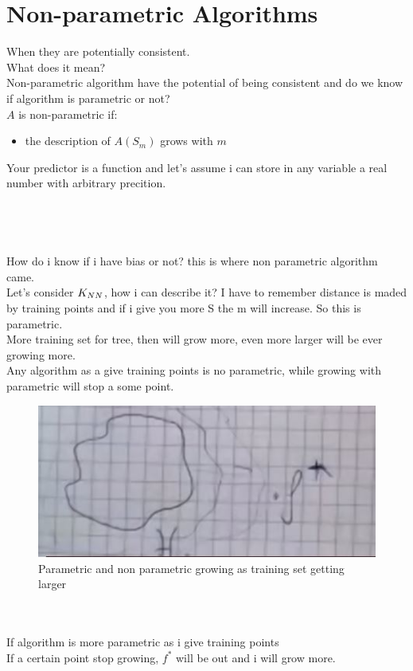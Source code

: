 \documentclass[../main.tex]{subfiles}
\begin{document}
\section{Non-parametric Algorithms}
When they are potentially consistent.
\\ What does it mean?\\
Non-parametric algorithm have the potential of being consistent and do we know if algorithm is parametric or not?
\\
$A$ is non-parametric if:
\begin{itemize}
\item the description of $A(S_m)$ grows with $m$
\end{itemize}
Your predictor is a function and let's assume i can store in any variable a real number with arbitrary precition. 
\\\\
\\\\
\\
How do i know if i have bias or not? this is where non parametric algorithm came.
\\
Let's consider $K_{NN}$, how i can describe it? I have to remember distance is maded by training points and if i give you more S the m will increase. So this is parametric. 
\\
More training set for tree, then will grow more, even more larger will be ever growing more.
\\
Any algorithm as a give training points is no parametric, while growing with parametric will stop a some point.
\\
\begin{figure}[h]
    \centering
    \includegraphics[width=0.5\linewidth]{../img/lez11-img4.JPG}
    \caption{Parametric  and non parametric growing as training set getting larger}
\end{figure}\\
\\
If algorithm is more parametric as i give training points\\
If a certain point stop growing, $f^*$ will be out and i will grow more.
\end{document}

